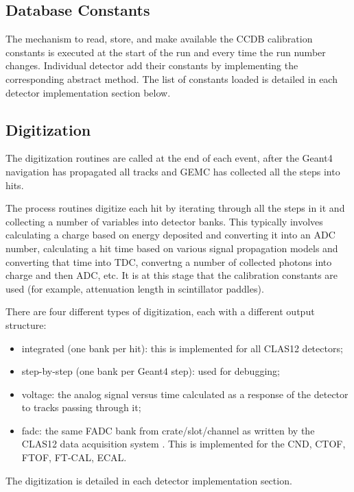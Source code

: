 \subsection{Database Constants}

The mechanism to read, store, and make available the CCDB \cite{ccdb} calibration constants is
executed at the start of the run and every time the run number changes.
Individual detector add their constants by implementing the corresponding abstract method.
The list of constants loaded is detailed in each detector implementation section below.

\subsection{Digitization}

The digitization routines are called at the end of each event, after the Geant4 navigation
has propagated all tracks and GEMC has collected all the steps into hits.

The process routines digitize each hit by iterating through all the steps in it and collecting
a number of variables into detector banks. This typically involves calculating a charge based
on energy deposited and converting it into an ADC number, calculating a hit time based
on various signal propagation models and converting that time into TDC, convertng a number
of collected photons into charge and then ADC, etc. It is at this stage that the calibration
constants are used (for example, attenuation length in scintillator paddles).

There are four different types of digitization, each with a different output structure:

\begin{itemize}
	\item integrated (one bank per hit): this is implemented for all CLAS12 detectors;
	\item step-by-step (one bank per Geant4 step): used for debugging;
	\item voltage: the analog signal versus time calculated as a response of the detector to tracks passing through it;
	\item fadc: the same FADC bank from crate/slot/channel as written by the CLAS12 data acquisition system \cite{daq2019}.
          This is implemented for the CND, CTOF, FTOF, FT-CAL, ECAL.
\end{itemize}


The digitization is detailed in each detector implementation section.


